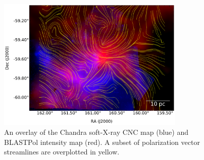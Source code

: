 \begin{figure}[!htbp]
\centering
\includegraphics[width=0.8\textwidth]{figures/carina/chandra_soft_sl}
\caption[~An overlay of the Chandra soft-X-ray CNC map (blue) and BLASTPol intensity map (red).]{An overlay of the Chandra soft-X-ray CNC map (blue) \citep{townsley2011introduction} and BLASTPol intensity map (red). A subset of polarization vector streamlines are overplotted in yellow.}
\label{fig:chandra_overplot}
\end{figure}

